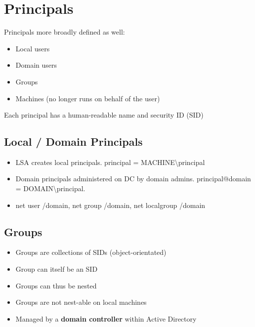 \documentclass{article}
\begin{document}
\section{Principals}
\begin{flushleft}
Principals more broadly defined as well: 
\begin{itemize}
\item Local users 
\item Domain users 
\item Groups 
\item Machines (no longer runs on behalf of the user)
\end{itemize}
 Each principal has a human-readable name and security ID (SID)
\end{flushleft}

\subsection{Local / Domain Principals}
\begin{itemize}
\item LSA creates local principals. principal = MACHINE\textbackslash principal 
\item Domain principals administered on DC by domain admins. principal@domain = DOMAIN\textbackslash principal.
\item net user /domain, net group /domain, net localgroup /domain
\end{itemize}

\subsection{Groups}
\begin{itemize}
  \item Groups are collections of SIDs (object-orientated) 
  \item Group can itself be an SID 
  \item Groups can thus be nested 
  \item Groups are not nest-able on local machines 
  \item Managed by a \textbf{domain controller} within Active Directory
\end{itemize}
\end{document}
